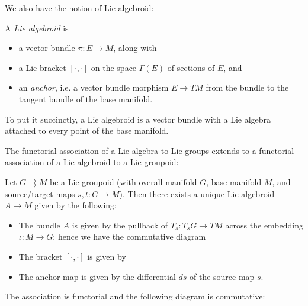 We also have the notion of Lie algebroid:
\begin{defn}
A \emph{Lie algebroid} is
\begin{itemize}
\item a vector bundle $\pi: E \to M$, along with
\item a Lie bracket $[\cdot,\cdot]$ on the space $\Gamma(E)$ of sections of $E$, and
\item an \emph{anchor}, i.e. a vector bundle morphism $E \to TM$ from the bundle to the tangent bundle of the base manifold.
\end{itemize}
\end{defn}
To put it succinctly, a Lie algebroid is a vector bundle with a Lie algebra attached to every point of the base manifold.


The functorial association of a Lie algebra to Lie groups extends to a functorial association of a Lie algebroid to a Lie groupoid:

\begin{thrm} %
Let $G \rightrightarrows M$ be a Lie groupoid (with overall manifold $G$, base manifold $M$, and source/target maps $s,t: G \to M$). Then there exists a unique Lie algebroid $A \to M$ given by the following:
\begin{itemize}
\item The bundle $A$ is given by the pullback of $T_s : T_sG \to TM$ across the embedding $\iota: M \to G$; %
hence we have the commutative diagram

\item The bracket $[\cdot,\cdot]$ is given by %

\item The anchor map is given by the differential $ds$ of the source map $s$.

\end{itemize}

The association is functorial and the following diagram is commutative:


\end{thrm}

